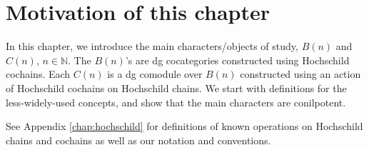 \section{Motivation of this chapter}
In this chapter, we introduce the main 
characters/objects of study, $B(n)$ and 
$C(n)$, $n \in \mathbb{N}$. The $B(n)$'s are 
dg cocategories constructed using 
Hochschild cochains. Each $C(n)$ is a dg 
comodule over $B(n)$ constructed using 
an action of Hochschild cochains on 
Hochschild chains. 
We start with definitions for the 
less-widely-used concepts, and show 
that the main characters are 
conilpotent.

See Appendix 
\ref{chap:hochschild} for definitions of 
known operations on Hochschild chains and 
cochains as well as our notation and  
conventions. 